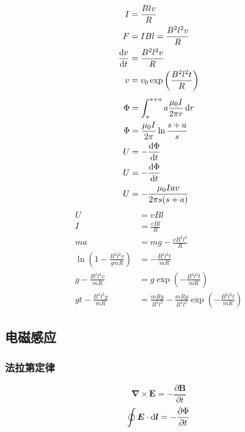 \begin{align*}
    I&=\frac{Blv}{R}\\
    F&=IBl=\frac{B^2l^2v}{R}\\
    \frac{\dif v}{\dif t}&=\frac{B^2l^2v}{R}\\
    v&=v_0\exp\left(\frac{B^2l^2t}{R}\right)
\end{align*}
\begin{align*}
    \Phi&=\int_{s}^{s+a}a\frac{\mu_0I}{2\pi r}\dif r\\
    \Phi&=\frac{\mu_0I}{2\pi}\ln\frac{s+a}{s}\\
    U&=-\frac{\dif \Phi}{\dif t}\\
    U&=-\frac{\dif \Phi}{\dif t}\\
    U&=-\frac{\mu_0Iav}{2\pi s(s+a)}
\end{align*}
\label{一个由厚铝板剪成的正方形线框的上半部被放置在一个匀强磁场}
\begin{align*}
    U&=vBl\\
    I&=\frac{vBl}{R}\\
    ma&=mg-\frac{vB^2l^2}{R}\\
    \ln\left(1-\frac{B^2l^2v}{gmR}\right)&=-\frac{B^2l^2t}{mR}\\
    g-\frac{B^2l^2v}{mR}&=g\exp\left(-\frac{B^2l^2t}{mR}\right)\\
    gt-\frac{B^2l^2y}{mR}&=\frac{mRg}{B^2l^2}-\frac{mRg}{B^2l^2}\exp\left(-\frac{B^2l^2t}{mR}\right)
\end{align*}
\subsection{电磁感应}
\subsubsection{法拉第定律}
\begin{equation}
    \boldsymbol{\nabla}\times\boldsymbol{E}=-\frac{\partial \boldsymbol{B}}{\partial t}
\end{equation}
\begin{equation}
    \oint\boldsymbol{E}\cdot\dif\boldsymbol{l}=-\frac{\partial \Phi}{\partial t}
\end{equation}
